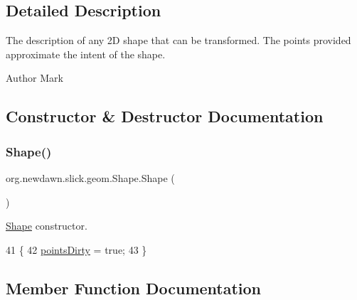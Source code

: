 \subsection{Detailed Description}
The description of any 2D shape that can be transformed. The points provided approximate the intent of the shape.

\begin{DoxyAuthor}{Author}
Mark 
\end{DoxyAuthor}


\subsection{Constructor \& Destructor Documentation}
\mbox{\label{classorg_1_1newdawn_1_1slick_1_1geom_1_1_shape_ab4721f44d2bdecd9d65a56181589b4b1}} 
\subsubsection{\texorpdfstring{Shape()}{Shape()}}
{\footnotesize\ttfamily org.\+newdawn.\+slick.\+geom.\+Shape.\+Shape (\begin{DoxyParamCaption}{ }\end{DoxyParamCaption})\hspace{0.3cm}{\ttfamily [inline]}}

\mbox{\hyperlink{classorg_1_1newdawn_1_1slick_1_1geom_1_1_shape}{Shape}} constructor. 
\begin{DoxyCode}
41                    \{
42         \mbox{\hyperlink{classorg_1_1newdawn_1_1slick_1_1geom_1_1_shape_a61fe1954d2fdefc72c34b284f4fcfdb4}{pointsDirty}} = \textcolor{keyword}{true};
43     \}
\end{DoxyCode}


\subsection{Member Function Documentation}
\mbox{\label{classorg_1_1newdawn_1_1slick_1_1geom_1_1_shape_a276adc040a678116054b860c4eb5adab}} 
